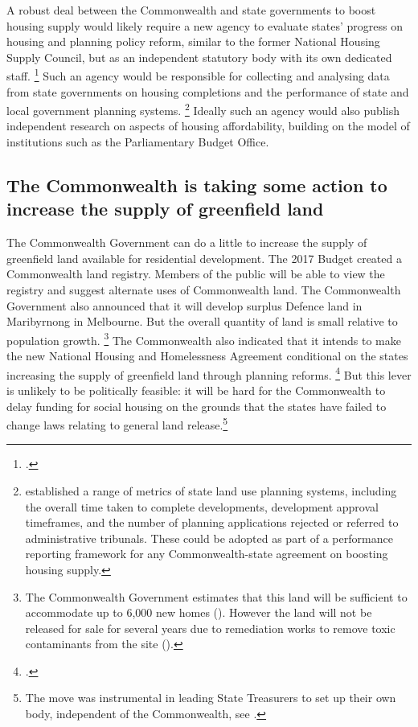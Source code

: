 A robust deal between the Commonwealth and state governments to boost housing supply would likely require a new agency to evaluate states' progress on housing and planning policy reform, similar to the former National Housing Supply Council, but as an independent statutory body with its own dedicated staff.%
    \footcite{NHSC}
Such an agency would be responsible for collecting and analysing data from state governments on housing completions and the performance of state and local government planning systems.%
    \footnote{\textcite{PC2011PerformanceBenchmark} established a range of metrics of state land use planning systems, including the overall time taken to complete developments, development approval timeframes, and the number of planning applications rejected or referred to administrative tribunals.
    These could be adopted as part of a performance reporting framework for any Commonwealth-state agreement on boosting housing supply.}
Ideally such an agency would also publish independent research on aspects of housing affordability, building on the model of institutions such as the Parliamentary Budget Office.


\subsection{The Commonwealth is taking some action to increase the supply of greenfield land}\label{subsec:the-commonwealth-is-taking-some-action-to-increase-the-supply-of-greenfield-land}

The Commonwealth Government can do a little to increase the supply of greenfield land available for residential development.
The 2017 Budget created a Commonwealth land registry. Members of the public will be able to view the registry and suggest alternate uses of Commonwealth land.
The Commonwealth Government also announced that it will develop surplus Defence land in Maribyrnong in Melbourne.
But the overall quantity of land is small relative to population growth.%
	\footnote{The Commonwealth Government estimates that this land will be sufficient to accommodate up to 6,000 new homes (\textcite{Budget1718-unlocking-CW-land}). However the land will not be released for sale for several years due to remediation works to remove toxic contaminants from the site (\textcite{TheAge-2017-Housing-fix-still-years-away}).}
The Commonwealth also indicated that it intends to make the new National Housing and Homelessness Agreement conditional on the states increasing the supply of greenfield land through planning reforms.%
	\footcite{Budget1718-New-Natl-Housing-Homelessness-Agreement}
But this lever is unlikely to be politically feasible: it will be hard for the Commonwealth to delay funding for social housing on the grounds that the states have failed to change laws relating to general land release.\footnote{The move was instrumental in leading State Treasurers to set up their own body, independent of the Commonwealth, see \textcites{Tabakoff_2017_Aus_revolt_against_Canberra}{NSW-Treasurer-press-release-States-treasurers}.}

